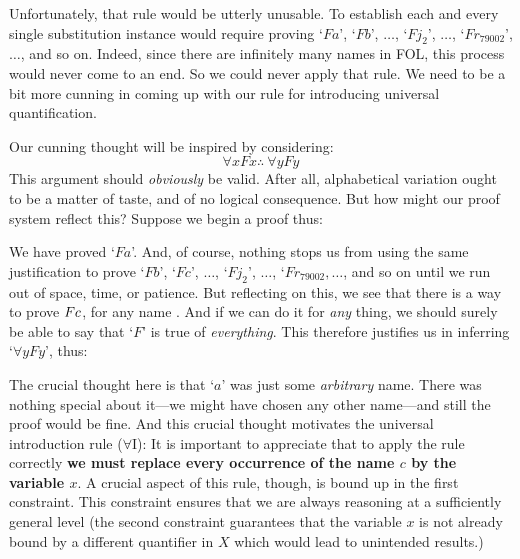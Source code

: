 Unfortunately, that rule would be utterly unusable. To establish each and every single substitution instance would require proving `$Fa$', `$Fb$', $\ldots$, `$Fj_2$', $\ldots$, `$Fr_{79002}$', $\ldots$, and so on. Indeed, since there are infinitely many names in FOL, this process would never come to an end. So we could never apply that rule. We need to be a bit more cunning in coming up with our rule for introducing universal quantification.

Our cunning thought will be inspired by considering:
$$\forall x Fx \therefore\ \forall y Fy$$
This argument should \emph{obviously} be valid. After all, alphabetical variation ought to be a matter of taste, and of no logical consequence. But how might our proof system reflect this? Suppose we begin a proof thus:
\begin{pf}
	 
\end{pf}
We have proved `$Fa$'. And, of course, nothing stops us from using the same justification to prove `$Fb$', `$Fc$', $\ldots$, `$Fj_2$', $\ldots$, `$Fr_{79002}, \ldots$, and so on until we run out of space, time, or patience. But reflecting on this, we see that there is a way to prove $Fc$, for any name . And if we can do it for \emph{any} thing, we should surely be able to say that `$F$' is true of \emph{everything}. This therefore justifies us in inferring `$\forall y Fy$', thus:
\begin{pf}
	 
	 
\end{pf}
The crucial thought here is that `$a$' was just some \emph{arbitrary} name. There was nothing special about it---we might have chosen any other name---and still the proof would be fine. And this crucial thought motivates the universal introduction rule ($\forall$I):
It is important to appreciate that to apply the rule correctly \textbf{we must replace every occurrence of the name $c$ by the variable $x$}. A crucial aspect of this rule, though, is bound up in the first constraint. This constraint ensures that we are always reasoning at a sufficiently general level (the second constraint guarantees that the variable $x$ is not already bound by a different quantifier in $X$ which would lead to unintended results.) 

